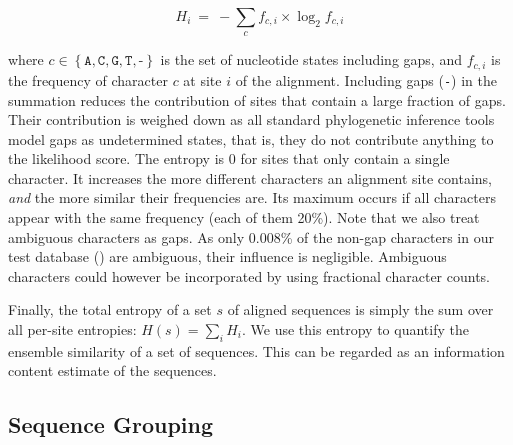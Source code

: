 \begin{equation*}
    H_{i} ~=~ -\sum_c f_{c,i} \times \log_{2} f_{c,i}
\end{equation*}

where $c \in \left\{ \texttt{A}, \texttt{C}, \texttt{G}, \texttt{T}, \texttt{-} \right\}$ is the set of nucleotide states
including gaps, and $ f_{c,i} $ is the frequency of character $c$ at site $i$ of the alignment.
Including gaps (\texttt{-}) in the summation reduces the contribution of sites that contain a large fraction of gaps.
Their contribution is weighed down as all standard phylogenetic inference tools model gaps as undetermined states,
that is, they do not contribute anything to the likelihood score.
The entropy is \num{0} for sites that only contain a single character.
It increases the more different characters an alignment site contains, {\em and} the more similar their frequencies are.
Its maximum occurs if all characters appear with the same frequency (each of them \num{20}\%).
Note that we also treat ambiguous characters as gaps.
As only \num{0.008}\% of the non-gap characters in our test database () are ambiguous,
their influence is negligible.
Ambiguous characters could however be incorporated by using fractional character counts.

Finally, the total entropy of a set $s$ of aligned sequences is simply the sum over all per-site entropies:
$H(s) = \sum_i H_i$.
We use this entropy to quantify the ensemble similarity of a set of sequences.
This can be regarded as an information content estimate of the sequences.


\subsection{Sequence Grouping}
\label{ch:AutomaticTrees:sec:Method:sub:SequenceGrouping}

